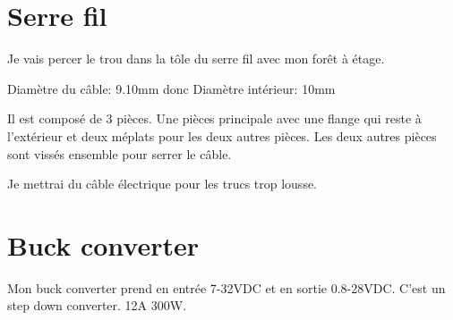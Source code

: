 \documentclass{article}
\begin{document}
\section{Serre fil}

Je vais percer le trou dans la tôle du serre fil avec mon forêt à étage.

Diamètre du câble: 9.10mm
donc
Diamètre intérieur: 10mm

Il est composé de 3 pièces. Une pièces principale avec une flange qui reste à l'extérieur et deux méplats pour les deux autres pièces. Les deux autres pièces sont vissés ensemble pour serrer le câble.

Je mettrai du câble électrique pour les trucs trop lousse.

\section{Buck converter}

Mon buck converter prend en entrée 7-32VDC et en sortie 0.8-28VDC. C'est un step down converter. 12A 300W.
\end{document}
